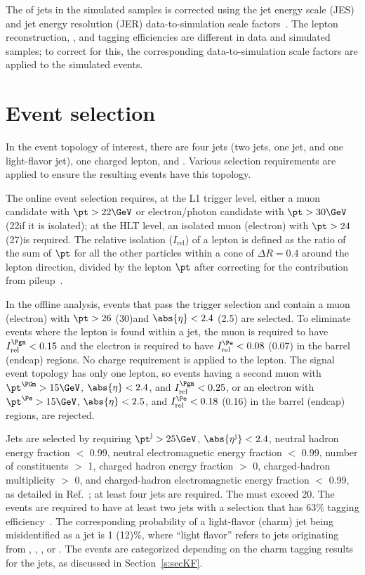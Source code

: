 The \pt of jets in the simulated samples is corrected 
using the jet energy scale (JES) and jet energy resolution (JER) 
data-to-simulation scale factors~\cite{Khachatryan:2016kdb}. The 
lepton reconstruction, \PQb, and \PQc tagging efficiencies are 
different in data and simulated samples; to correct for this, the 
corresponding data-to-simulation scale factors are applied to the 
simulated events.

\section{Event selection}
\label{s:secEvtSel}
In the event topology of interest, there are four jets (two \PQb jets,
one \PQc jet, and one light-flavor jet), one charged lepton, and
\ptmiss. Various selection requirements are applied to ensure the
resulting events have this topology.

The online event selection requires, at the L1 trigger level, either a
muon candidate with $\pt > 22\GeV$ or electron/photon candidate with
$\pt > 30\GeV$ (22\GeV if it is isolated); at the HLT level, an
isolated muon (electron) with $\pt > 24$ (27)\GeV is required.
The relative isolation ($I_\text{rel}$) of a lepton is defined as the
ratio of the sum of $\pt$ for all the other particles within a cone of
$\Delta R = 0.4$ around the lepton direction, divided by the lepton
$\pt$ after correcting for the contribution from
pileup~\cite{Sirunyan:2018fpa,Cacciari:2007fd}.

In the offline analysis, events that pass the trigger selection and
contain a muon (electron) with $\pt > 26$ (30)\GeV and $\abs{\eta} < 2.4$
(2.5) are selected. To eliminate events where the lepton is found
within a jet, the muon is required to have $I_\text{rel}^{\Pgm} < 0.15$
and the electron is required to have $I_\text{rel}^{\Pe} < 0.08$
(0.07) in the barrel (endcap) regions. No charge requirement is
applied to the lepton. The signal event topology has only one lepton,
so events having a second muon with $\pt^{\PGm} > 15\GeV$, $\abs{\eta} < 2.4$,
and $I_\text{rel}^{\Pgm} < 0.25$, or an electron with $\pt^{\Pe} > 15\GeV$,
$\abs{\eta} < 2.5$, and $I_\text{rel}^{\Pe} < 0.18$ (0.16) in the barrel
(endcap) regions, are rejected.

Jets are selected by requiring $\pt^\text{j} > 25\GeV$,
$\abs{\eta^\text{j}} < 2.4$, neutral hadron energy fraction $<$ 0.99,
neutral electromagnetic energy fraction $<$ 0.99, number of
constituents $>$ 1, charged hadron energy fraction $>$ 0,
charged-hadron multiplicity $>$ 0, and charged-hadron electromagnetic
energy fraction $<$ 0.99, as detailed in Ref.~\cite{Sirunyan:2017ulk};
at least four jets are required. The \ptmiss must exceed 20\GeV. The
events are required to have at least two \PQb jets with a selection that
has 63\% \PQb tagging efficiency~\cite{Sirunyan:2017ezt}. The corresponding 
probability of a light-flavor (charm) jet being misidentified as a \PQb 
jet is 1 (12)\%, where ``light flavor'' refers to jets originating from 
\PQu, \PQd, \PQs, or \Pg. The events are categorized depending on the 
charm tagging results for the jets, as discussed in Section~\ref{s:secKF}.

